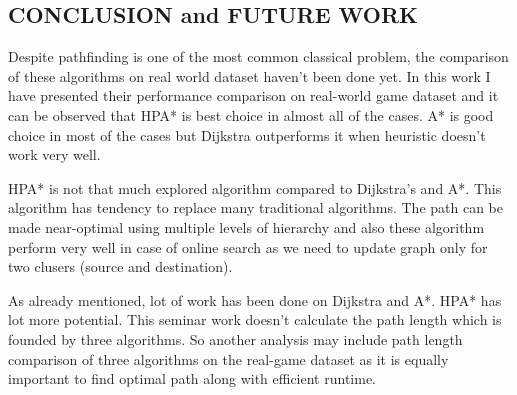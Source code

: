\documentclass[a4paper, 12pt]{article}
\begin{document}
\newpage
\begin{center}
\section{CONCLUSION and FUTURE WORK}
\end{center}
\par \hspace{1cm}
Despite pathfinding is one of the most common classical problem, the comparison of these algorithms on real world dataset haven't been done yet. In this work I have presented their performance comparison on real-world game dataset and it can be observed that HPA* is best choice in almost all of the cases. A* is good choice in most of the cases but Dijkstra outperforms it when heuristic doesn't work very well.
\\
\par \hspace{1cm} HPA* is not that much explored algorithm compared to Dijkstra's and A*. This algorithm has tendency to replace many traditional algorithms. The path can be made near-optimal using multiple levels of hierarchy and also these algorithm perform very well in case of online search as we need to update graph only for two clusers (source and destination).
\\
 \par \hspace{1cm} As already mentioned, lot of work has been done on Dijkstra and A*. HPA* has lot more potential. This seminar work doesn't calculate the path length which is founded by three algorithms. So another analysis may include path length comparison of three algorithms on the real-game dataset as it is equally important to find optimal path along with efficient runtime. 
\\
\end{document}
